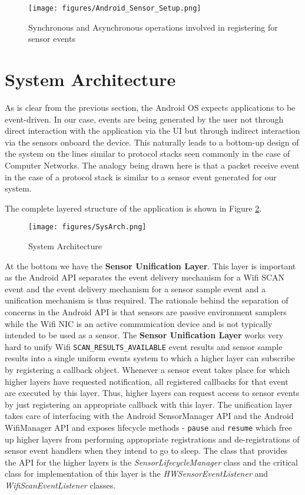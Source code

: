 \begin{figure}
    \centering
    \texttt{[image: figures/Android\_Sensor\_Setup.png]}
    \caption{Synchronous and Asynchronous operations involved in registering for sensor events\label{fig:sensor_event}}
\end{figure}


\section{System Architecture}

As is clear from the previous section, the Android OS expects applications to 
be event-driven. In our case, events are being generated by the user 
not through direct interaction with the application via the UI but through 
indirect interaction via the sensors onboard the device. This naturally 
leads to a bottom-up design of the system on the lines similar to protocol
stacks seen commonly in the case of Computer Networks. The analogy
being drawn here is that a packet receive event in the case of a 
protocol stack is similar to a sensor event generated for our system. 

The complete layered structure of the application is shown in Figure 
\ref{fig:system_architecture}.

\begin{figure}
    \centering
    \texttt{[image: figures/SysArch.png]}
    \caption{System Architecture\label{fig:system_architecture}}
\end{figure}

At the bottom we have the \textbf{Sensor Unification Layer}. This layer is 
important as the Android API separates the event delivery mechanism 
for a Wifi SCAN event and the event delivery mechanism for a sensor 
sample event and a unification mechanism is thus required. 
The rationale behind the separation of concerns in the Android API is 
that sensors are passive environment samplers while the Wifi NIC is an active communication 
device and is not typically intended to be used as a sensor. The \textbf{Sensor 
Unification Layer} works very hard to unify Wifi {\tt SCAN\_RESULTS\_AVAILABLE} event results and 
sensor sample results into a single uniform events system to which 
a higher layer can subscribe by registering a callback object. Whenever 
a sensor event takes place for which higher layers have requested notification,
all registered callbacks for that event are executed by this layer. Thus,
higher layers can request access to sensor events by just registering an 
appropriate callback with this layer. The unification layer takes care of 
interfacing with the Android SensorManager API and the Android WifiManager API
and exposes lifecycle methods - \texttt{pause} and \texttt{resume} which free up 
higher layers from performing appropriate registrations and de-registrations
of sensor event handlers when they intend to go to sleep. The class that 
provides the API for the higher layers is the \emph{SensorLifecycleManager} class
and the critical class for implementation of this layer is the 
\emph{HWSensorEventListener} and \emph{WifiScanEventListener} classes. 

